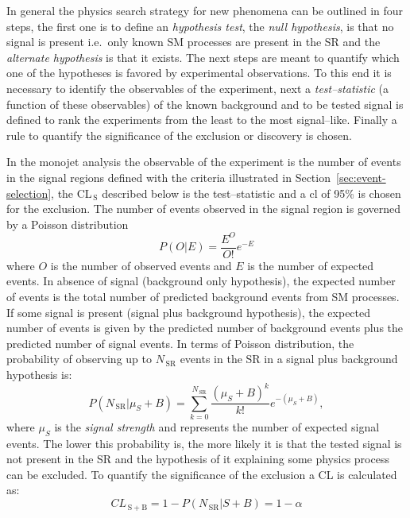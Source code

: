 In general the physics search strategy for new phenomena can be outlined in four
steps, the first one is to define an \emph{hypothesis test}, the \emph{null
  hypothesis}, is that no signal is present i.e.~only known SM processes are
present in the SR and the \emph{alternate hypothesis} is that it exists. The
next steps are meant to quantify which one of the hypotheses is favored by
experimental observations. To this end it is necessary to identify the
observables of the experiment, next a \emph{test--statistic} (a function of
these observables) of the known background and to be tested signal is defined to
rank the experiments from the least to the most signal--like. Finally a rule to
quantify the significance of the exclusion or discovery is chosen.

In the monojet analysis the observable of the experiment is the number of events
in the signal regions defined with the criteria illustrated in
Section~\ref{sec:event-selection}, the CL$_\mathrm{\, S}$ described below is the
test--statistic and a \gls{cl} of 95\% is chosen for the exclusion. The number
of events observed in the signal region is governed by a Poisson distribution
\begin{equation}
  \label{eq:86}
  P(O|E) = \frac{E^O }{O!} e^{- E}
\end{equation}
where $O$ is the number of observed events and $E$ is the number of expected
events. In absence of signal (background only hypothesis), the expected number
of events is the total number of predicted background events from SM
processes. If some signal is present (signal plus background hypothesis), the
expected number of events is given by the predicted number of background events
plus the predicted number of signal events. In terms of Poisson distribution,
the probability of observing up to $N_\mathrm{\, SR}$ events in the SR in a
signal plus background hypothesis is:
\begin{equation}
  \label{eq:87}
  P(N_\mathrm{\, SR}|\mu_S + B) = \sum^{N_\mathrm{\, SR}}_{k = 0} \frac{(\mu_S + B)^k}{k!}
  e^{- (\mu_S + B)},
\end{equation}
where $\mu_S$ is the \emph{signal strength} and represents the number of
expected signal events. The lower this probability is, the more likely it is
that the tested signal is not present in the SR and the hypothesis of it
explaining some physics process can be excluded. To quantify the significance of
the exclusion a CL is calculated as:
\begin{equation}
  \label{eq:88}
  CL_\mathrm{\, S+B} = 1 - P(N_\mathrm{\, SR}|S+B) = 1 - \alpha
\end{equation}

